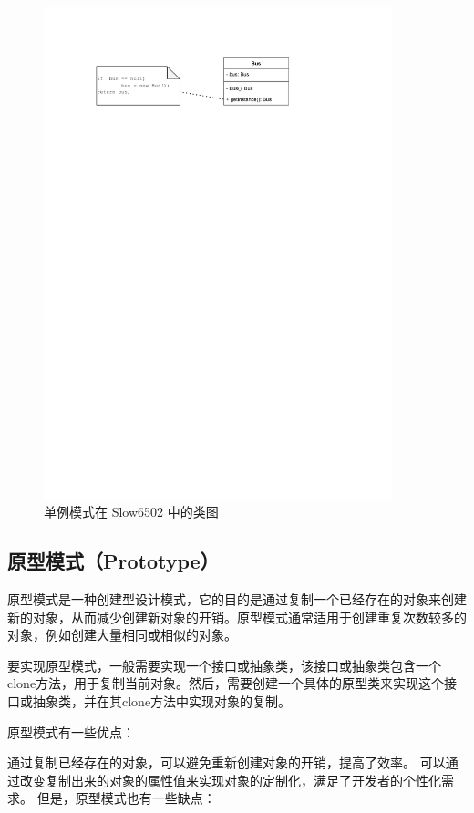 \documentclass[cn,black,12pt,normal]{elegantnote}
\begin{document}
\begin{figure}[H]
  \centering
  \includegraphics[width=0.9\textwidth]{figures/单例.pdf}
  \caption{单例模式在 Slow6502 中的类图}
\end{figure}



\subsection{原型模式（Prototype）}

原型模式是一种创建型设计模式，它的目的是通过复制一个已经存在的对象来创建新的对象，从而减少创建新对象的开销。原型模式通常适用于创建重复次数较多的对象，例如创建大量相同或相似的对象。

要实现原型模式，一般需要实现一个接口或抽象类，该接口或抽象类包含一个clone方法，用于复制当前对象。然后，需要创建一个具体的原型类来实现这个接口或抽象类，并在其clone方法中实现对象的复制。

原型模式有一些优点：

通过复制已经存在的对象，可以避免重新创建对象的开销，提高了效率。
可以通过改变复制出来的对象的属性值来实现对象的定制化，满足了开发者的个性化需求。
但是，原型模式也有一些缺点：
\end{document}
